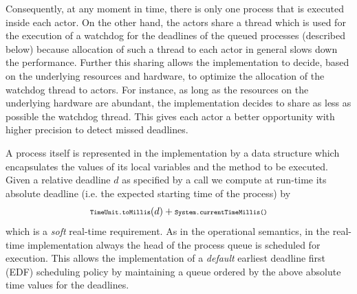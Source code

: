 Consequently, at any moment in time, there is only one process that is executed inside each actor.
On the other hand, the actors share a thread which is used
for the execution of a  watchdog for the deadlines of the queued processes (described below) because allocation of such a   thread to each actor  in general slows down the performance.
Further  this sharing  allows the implementation to decide, based on the underlying resources and hardware, to optimize the allocation of the watchdog thread to actors.
For instance, as long as the resources on the underlying hardware are abundant, the implementation decides to share as less as possible the watchdog thread.
This gives each actor a better opportunity with higher precision to detect missed deadlines.


A process itself is represented in the implementation by a data structure
which encapsulates the values of its local variables and the method to be executed.
Given a relative deadline $d$ as specified by a call
we compute at run-time its absolute deadline (i.e. the expected starting time of the process) by
$$
 {\scriptsize\texttt{TimeUnit.toMillis}}(d) + {\scriptsize\texttt{System.currentTimeMillis()}}
$$
which is a \emph{soft} real-time requirement.
As in the operational semantics, in the real-time implementation
always the head of the process queue  is scheduled for execution.
This allows the implementation of a \emph{default}
earliest deadline first (EDF) scheduling policy
by  maintaining a queue ordered by  the above absolute time values for the deadlines.

